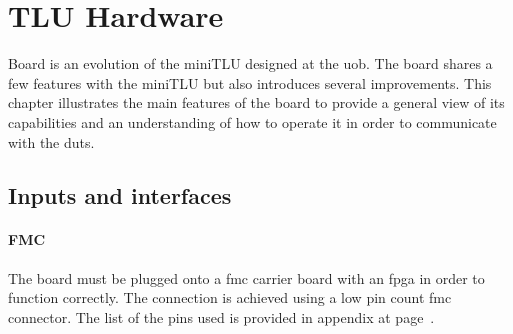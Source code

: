 \chapter{TLU Hardware}\label{ch:hardware}
Board \brd is an evolution of the miniTLU designed at the \gls{uob}. The board shares a few features with the miniTLU but also introduces several improvements. This chapter illustrates the main features of the board to provide a general view of its capabilities and an understanding of how to operate it in order to communicate with the \gls{dut}s.

\section{Inputs and interfaces}\label{ch:hwDUT}
\subsubsection{FMC}
The board must be plugged onto a \gls{fmc} carrier board with an \gls{fpga} in order to function correctly. The connection is achieved using a low pin count \gls{fmc} connector. The list of the pins used is provided in appendix at page~\pageref{ch:appendix}.\\

